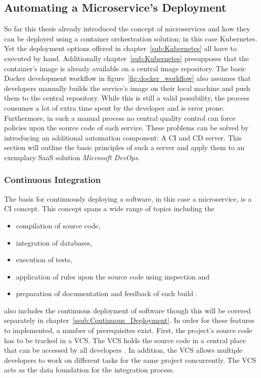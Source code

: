 
\subsection{Automating a Microservice's Deployment}%
\label{sub:Automatic_a_Microservices_Deployment}
So far this thesis already introduced the concept of microservices and how they
can be deployed using a container orchestration solution; in this case
Kubernetes. Yet the deployment options offered in chapter~\ref{sub:Kubernetes}
all have to executed by hand. Additionally chapter~\ref{sub:Kubernetes}
presupposes that the container's image is already available on a central image
repository. The basic Docker development workflow in
figure~\ref{fig:docker_workflow} also assumes that developers manually builds
the service's image on their local machine and push them to the central
repository. While this is still a valid possibility, the process consumes a lot
of extra time spent by the developer and is error prone. Furthermore, in such a
manual process no central quality control can force policies upon the source
code of each service. These problems can be solved by introducing an additional
automation component: A \ac{CI} and \ac{CD} server. This section will outline
the basic principles of such a server and apply them to an exemplary \ac{SaaS}
solution \textit{Microsoft DevOps}.

\subsubsection{Continuous Integration}%
\label{ssub:Continuous_Integration}
The basis for continuously deploying a software, in this case a microservice,
is a \ac{CI} concept. This concept spans a wide range of topics including the
\begin{itemize}
  \item compilation of source code,
  \item integration of databases,
  \item execution of tests,
  \item application of rules upon the source code using inspection and
  \item preparation of documentation and feedback of each build \autocite[pp.
    12-20]{MatyasContinuousIntegration2007}.
\end{itemize}

\autocite{MatyasContinuousIntegration2007} also includes the continuous
deployment of software though this will be covered separately in
chapter~\ref{ssub:Continuous_Deployment}. In order for these features to
implemented, a number of prerequisites exist. First, the project's source code
has to be tracked in a \ac{VCS}. The \ac{VCS} holds the source code in a
central place that can be accessed by all developers \autocite[Ch.
1]{MatyasContinuousIntegration2007}. In addition, the \ac{VCS} allows multiple
developers to work on different tasks for the same project concurrently. The
\ac{VCS} acts as the data foundation for the integration process.

